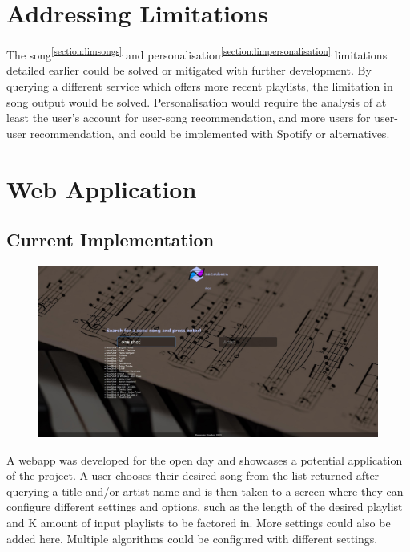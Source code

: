 \documentclass[a4paper, 12pt]{report}
\begin{document}
\section{Addressing Limitations}
The song\textsuperscript{\ref{section:limsongs}} and personalisation\textsuperscript{\ref{section:limpersonalisation}} limitations detailed earlier could be solved or mitigated with further development.
By querying a different service which offers more recent playlists, the limitation in song output would be solved.
Personalisation would require the analysis of at least the user's account for user-song recommendation, and more users for user-user recommendation,
and could be implemented with Spotify or alternatives.

\section{Web Application}\label{chap:webapp}
\subsection*{Current Implementation}
\begin{figure}[H]
    \centering
    \includegraphics[width=\textwidth]{webapp.jpeg}
\end{figure}

A webapp was developed for the open day and showcases a potential application of the project.
A user chooses their desired song from the list returned after querying a title and/or artist name and is then taken to a screen where they can configure
different settings and options, such as the length of the desired playlist and K amount of input playlists to be factored in. More settings could also be added here.
Multiple algorithms could be configured with different settings.
\end{document}
